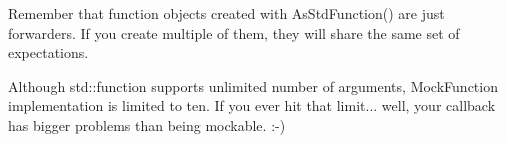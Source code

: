 Remember that function objects created with {\ttfamily As\+Std\+Function()} are just forwarders. If you create multiple of them, they will share the same set of expectations.

Although {\ttfamily std\+::function} supports unlimited number of arguments, {\ttfamily Mock\+Function} implementation is limited to ten. If you ever hit that limit... well, your callback has bigger problems than being mockable. \+:-\/) 